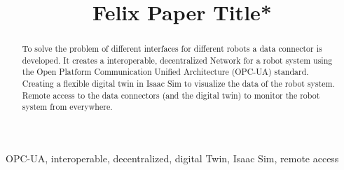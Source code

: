 \documentclass[conference]{IEEEtran}
\begin{document}
\title{Felix Paper Title*}

\author{
\and
{}
\and
{}
}

\maketitle

\begin{abstract}
To solve the problem of different interfaces for different robots a data connector is developed.
It creates a interoperable, decentralized Network for a robot system using the Open Platform Communication Unified Architecture (OPC-UA) standard.
Creating a flexible digital twin in Isaac Sim to visualize the data of the robot system.
Remote access to the data connectors (and the digital twin) to monitor the robot system from everywhere.
\end{abstract}

\begin{IEEEkeywords}
OPC-UA, interoperable, decentralized, digital Twin, Isaac Sim, remote access
\end{IEEEkeywords}
\end{document}
